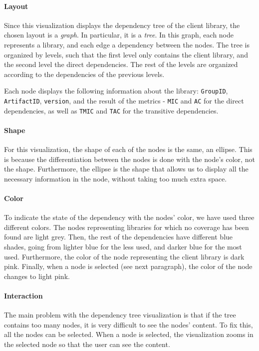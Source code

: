 \paragraph{Layout}
Since this visualization displays the dependency tree of the client library, the chosen layout is a \textit{graph}. In particular, it is a \textit{tree}. In this graph, each node represents a library, and each edge a dependency between the nodes. The tree is organized by levels, such that the first level only contains the client library, and the second level the direct dependencies. The rest of the levels are organized according to the dependencies of the previous levels.

Each node displays the following information about the library: \texttt{GroupID}, \texttt{ArtifactID}, \texttt{version}, and the result of the metrics - \texttt{MIC} and \texttt{AC} for the direct dependencies, as well as \texttt{TMIC} and \texttt{TAC} for the transitive dependencies.

\paragraph{Shape}
For this visualization, the shape of each of the nodes is the same, an ellipse. This is because the differentiation between the nodes is done with the node's color, not the shape. Furthermore, the ellipse is the shape that allows us to display all the necessary information in the node, without taking too much extra space.

\paragraph{Color}
To indicate the state of the dependency with the nodes' color, we have used three different colors. The nodes representing libraries for which no coverage has been found are light grey. Then, the rest of the dependencies have different blue shades, going from lighter blue for the less used, and darker blue for the most used. Furthermore, the color of the node representing the client library is dark pink. Finally, when a node is selected (see next paragraph), the color of the node changes to light pink.

\paragraph{Interaction}
The main problem with the dependency tree visualization is that if the tree contains too many nodes, it is very difficult to see the nodes' content. To fix this, all the nodes can be selected. When a node is selected, the visualization zooms in the selected node so that the user can see the content.

